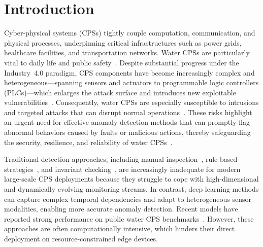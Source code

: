 \documentclass[pdflatex,sn-mathphys-num]{sn-jnl}%
\theoremstyle{thmstyleone}
\theoremstyle{thmstyletwo}%
\theoremstyle{thmstylethree}%
\begin{document}


\maketitle

\section{Introduction}
Cyber-physical systems (CPSs) tightly couple computation, communication, and physical processes, underpinning critical infrastructures such as power grids, healthcare facilities, and transportation networks. Water CPSs are particularly vital to daily life and public safety~\cite{chowdhury2025cyber}. Despite substantial progress under the Industry~4.0 paradigm, CPS components have become increasingly complex and heterogeneous---spanning sensors and actuators to programmable logic controllers (PLCs)---which enlarges the attack surface and introduces new exploitable vulnerabilities~\cite{kayan2022cybersecurity}. Consequently, water CPSs are especially susceptible to intrusions and targeted attacks that can disrupt normal operations~\cite{almazyad2023anomaly}. These risks highlight an urgent need for effective anomaly detection methods that can promptly flag abnormal behaviors caused by faults or malicious actions, thereby safeguarding the security, resilience, and reliability of water CPSs~\cite{gulzar2024analytical}.

Traditional detection approaches, including manual inspection~\cite{gulzar2024analytical}, rule-based strategies~\cite{punal2002expert}, and invariant checking~\cite{adepu2016using}, are increasingly inadequate for modern large-scale CPS deployments because they struggle to cope with high-dimensional and dynamically evolving monitoring streams. In contrast, deep learning methods can capture complex temporal dependencies and adapt to heterogeneous sensor modalities, enabling more accurate anomaly detection. Recent models have reported strong performance on public water CPS benchmarks~\cite{audibert2020usad,tuli2022tranad}. However, these approaches are often computationally intensive, which hinders their direct deployment on resource-constrained edge devices.
\end{document}
